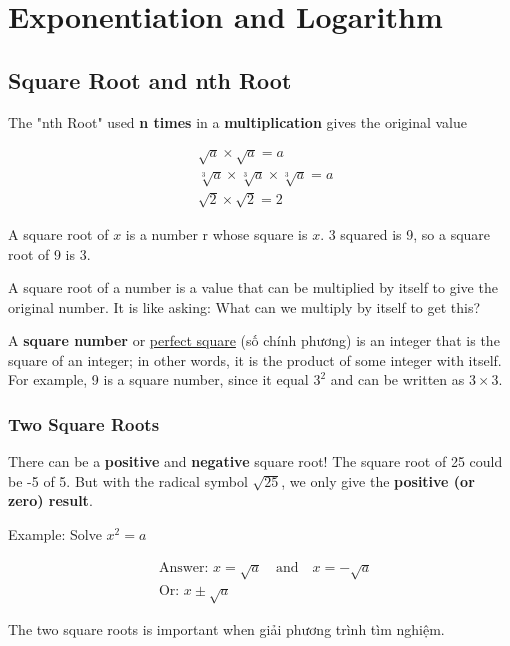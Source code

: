 \chapter{Exponentiation and Logarithm}

\section{Square Root and nth Root}

The "nth Root" used \textbf{n times} in a \textbf{multiplication} gives the original value

\[
  \begin{aligned}
    &\sqrt{a} \times \sqrt{a} = a\\
    &\sqrt[3]{a} \times \sqrt[3]{a} \times \sqrt[3]{a} = a\\
    &\sqrt{2} \times \sqrt{2} = 2
  \end{aligned}
\]

A square root of $x$ is a number r whose square is $x$. 3 squared is 9, so a square root of 9 is 3.

A square root of a number is a value that can be multiplied by itself to give the original number. It is like asking: What can we multiply by itself to get this?

A \textbf{square number} or \href{https://en.wikipedia.org/wiki/Square_number}{perfect square} (số chính phương) is an integer that is the square of an integer; in other words, it is the product of some integer with itself. For example, 9 is a square number, since it equal $3^{2}$ and can be written as $3 \times 3$.

\subsection{Two Square Roots}

There can be a \textbf{positive} and \textbf{negative} square root! The square root of 25 could be -5 of 5. But with the radical symbol $\sqrt{25}$, we only give the \textbf{positive (or zero) result}.

Example: Solve $x^{2}=a$

\[
  \begin{aligned}
    &\text{Answer: }x = \sqrt{a} \quad \text{and} \quad x = -\sqrt{a}\\
    &\text{Or: } x \pm \sqrt{a}
  \end{aligned}
\]

The two square roots is important when giải phương trình tìm nghiệm. 

